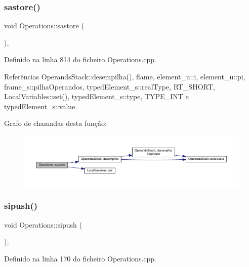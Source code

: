 \subsubsection{\texorpdfstring{sastore()}{sastore()}}
{\footnotesize\ttfamily void Operations\+::sastore (\begin{DoxyParamCaption}{ }\end{DoxyParamCaption})\hspace{0.3cm}{\ttfamily [static]}, {\ttfamily [private]}}



Definido na linha 814 do ficheiro Operations.\+cpp.



Referências Operands\+Stack\+::desempilha(), flame, element\+\_\+u\+::i, element\+\_\+u\+::pi, frame\+\_\+s\+::pilha\+Operandos, typed\+Element\+\_\+s\+::real\+Type, R\+T\+\_\+\+S\+H\+O\+RT, Local\+Variables\+::set(), typed\+Element\+\_\+s\+::type, T\+Y\+P\+E\+\_\+\+I\+NT e typed\+Element\+\_\+s\+::value.

Grafo de chamadas desta função\+:
\nopagebreak
\begin{figure}[H]
\begin{center}
\leavevmode
\includegraphics[width=350pt]{classOperations_aab1c34c455478d75c21cdb06d6c94172_cgraph}
\end{center}
\end{figure}
\mbox{\label{classOperations_aed3838c73d7febfcacab9f101e6946ad}} 
\subsubsection{\texorpdfstring{sipush()}{sipush()}}
{\footnotesize\ttfamily void Operations\+::sipush (\begin{DoxyParamCaption}{ }\end{DoxyParamCaption})\hspace{0.3cm}{\ttfamily [static]}, {\ttfamily [private]}}



Definido na linha 170 do ficheiro Operations.\+cpp.



